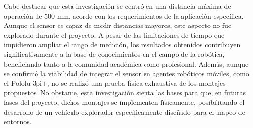 Cabe destacar que esta investigación se centró en una distancia máxima de operación de 500 mm, acorde con los requerimientos de la aplicación específica. Aunque el sensor es capaz de medir distancias mayores, este aspecto no fue explorado durante el proyecto. A pesar de las limitaciones de tiempo que impidieron ampliar el rango de medición, los resultados obtenidos contribuyen significativamente a la base de conocimientos en el campo de la robótica, beneficiando tanto a la comunidad académica como profesional. Además, aunque se confirmó la viabilidad de integrar el sensor en agentes robóticos móviles, como el Pololu 3pi+, no se realizó una prueba física exhaustiva de los montajes propuestos. No obstante, esta investigación sienta las bases para que, en futuras fases del proyecto, dichos montajes se implementen físicamente, posibilitando el desarrollo de un vehículo explorador específicamente diseñado para el mapeo de entornos.





